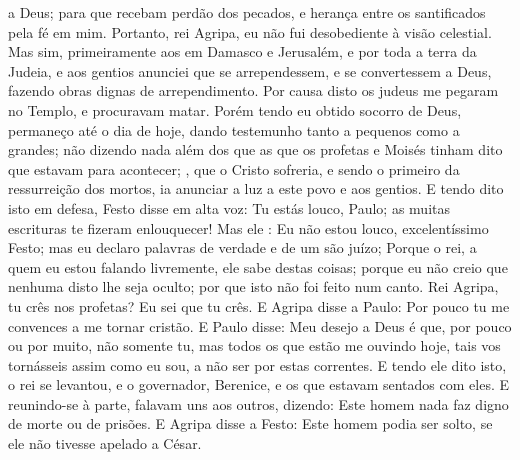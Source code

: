 {{} a Deus; para que recebam perdão dos pecados, e herança entre os santificados pela fé em mim.
Portanto, rei Agripa, eu não fui desobediente à visão celestial.
Mas sim, primeiramente aos
{} em Damasco e Jerusalém, e por toda a terra da Judeia, e aos gentios anunciei que se arrependessem, e se convertessem a Deus, fazendo obras dignas de arrependimento.
Por causa disto os judeus me pegaram no Templo, e procuravam
{} matar.
Porém tendo eu obtido socorro de Deus, permaneço até o dia de hoje, dando testemunho tanto a pequenos como a grandes; não dizendo nada além dos que as
{} que os profetas e Moisés tinham dito que estavam para acontecer;
 , que o Cristo sofreria, e sendo o primeiro da ressurreição dos mortos, ia anunciar a luz a este povo e aos gentios.
E tendo
{} dito isto em
{} defesa, Festo disse em alta voz: Tu estás louco, Paulo; as muitas escrituras te fizeram enlouquecer!
Mas ele
{} : Eu não estou louco, excelentíssimo Festo; mas eu declaro palavras de verdade e de um são juízo;
Porque o rei, a quem eu estou falando livremente, ele sabe
{} destas coisas; porque eu não creio que nenhuma disto lhe seja oculto; por que isto não foi feito num canto.
Rei Agripa, tu crês nos profetas? Eu sei que tu crês.
E Agripa disse a Paulo: Por pouco tu me convences a me tornar cristão.
E Paulo disse: Meu desejo a Deus é que, por pouco ou por muito, não somente tu, mas todos os que estão me ouvindo hoje, tais vos tornásseis assim como eu sou, a não ser por estas correntes.
E tendo ele dito isto, o rei se levantou, e
{} o governador, Berenice, e os que estavam sentados com eles.
E reunindo-se à parte, falavam uns aos outros, dizendo: Este homem nada faz
{} digno de morte ou de prisões.
E Agripa disse a Festo: Este homem podia ser solto, se ele não tivesse apelado a César.

}
